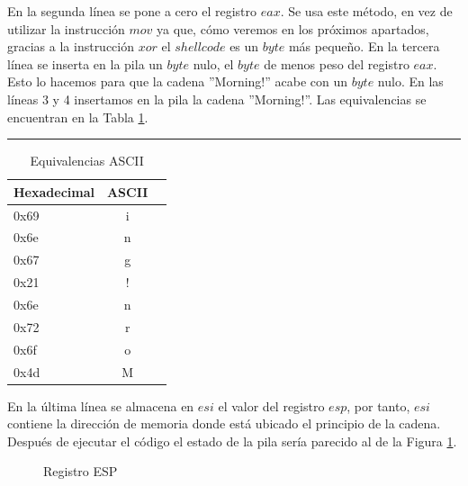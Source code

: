 \documentclass [titlepage, 12pt]{article}
\newcommand{\topfigrule}{\hrule\vspace{4 pt}}
\newcommand{\botfigrule}{\hrule\vspace{4 pt}}
\begin{document}
En la segunda l\'inea se pone a cero el registro $eax$. Se usa este m\'etodo, en vez de utilizar la instrucci\'on $mov$ ya que, c\'omo veremos en los pr\'oximos apartados, gracias a la instrucci\'on $xor$ el $shellcode$ es un $byte$ m\'as peque\~no. En la tercera l\'inea se inserta en la pila un $byte$ nulo, el $byte$ de menos peso del registro $eax$. Esto lo hacemos para que la cadena ''Morning!'' acabe con un $byte$ nulo. En las l\'ineas 3 y 4 insertamos en la pila la cadena ''Morning!''. Las equivalencias se encuentran en la Tabla \ref{tab:equivalencias}.
\begin{table}[!htp]
	\topfigrule
   	\addtolength{\abovecaptionskip}{-12pt}   	
   	\caption{Equivalencias ASCII}
   	\label{tab:equivalencias}   		
	\begin{center}
	\begin{tabular}{||l | c | r||}
		\hline
		\hline
		Hexadecimal & ASCII \\
		\hline
		0x69 & i\\
		\hline
		0x6e & n\\
		\hline
		0x67 & g\\
		\hline
		0x21 & !\\
		\hline
		0x6e & n\\
		\hline
		0x72 & r\\
		\hline
		0x6f & o\\
		\hline
		0x4d & M\\
		\hline
	\end{tabular} %
	\end{center}
\end{table}

En la \'ultima l\'inea se almacena en $esi$ el valor del registro $esp$, por tanto, $esi$ contiene la direcci\'on de memoria donde est\'a ubicado el principio de la cadena.\\
Despu\'es de ejecutar el c\'odigo el estado de la pila ser\'ia parecido al de la Figura \ref{fig:esp}.

\begin{figure}[!hbp]
	\caption{Registro ESP}
    \label{fig:esp}  
    \centering
    \addtolength{\abovecaptionskip}{-12pt}    
\end{figure}
\end{document}

